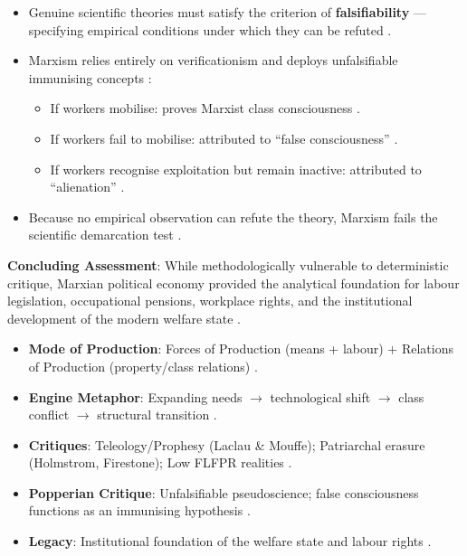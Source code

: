 \begin{KeyConcept}
\begin{itemize}
    \item Genuine scientific theories must satisfy the criterion of \textbf{falsifiability} --- specifying empirical conditions under which they can be refuted .
    \item Marxism relies entirely on verificationism and deploys unfalsifiable immunising concepts :
    \begin{itemize}
        \item If workers mobilise: proves Marxist class consciousness .
        \item If workers fail to mobilise: attributed to ``false consciousness'' .
        \item If workers recognise exploitation but remain inactive: attributed to ``alienation'' .
    \end{itemize}
    \item Because no empirical observation can refute the theory, Marxism fails the scientific demarcation test .
\end{itemize}
\end{KeyConcept}

\begin{CriticalPoint}
\textbf{Concluding Assessment}: While methodologically vulnerable to deterministic critique, Marxian political economy provided the analytical foundation for labour legislation, occupational pensions, workplace rights, and the institutional development of the modern welfare state .
\end{CriticalPoint}

\begin{QuickRevision}
\begin{itemize}
    \item \textbf{Mode of Production}: Forces of Production (means + labour) $+$ Relations of Production (property/class relations) .
    \item \textbf{Engine Metaphor}: Expanding needs $\rightarrow$ technological shift $\rightarrow$ class conflict $\rightarrow$ structural transition .
    \item \textbf{Critiques}: Teleology/Prophesy (Laclau \& Mouffe); Patriarchal erasure (Holmstrom, Firestone); Low FLFPR realities .
    \item \textbf{Popperian Critique}: Unfalsifiable pseudoscience; false consciousness functions as an immunising hypothesis .
    \item \textbf{Legacy}: Institutional foundation of the welfare state and labour rights .
\end{itemize}
\end{QuickRevision}

